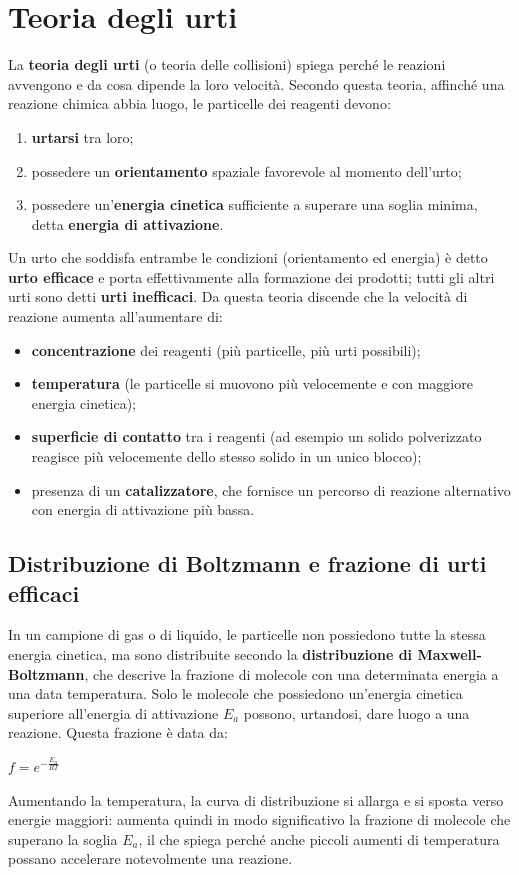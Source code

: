 \documentclass[11pt, a4paper, openright]{book}
\begin{document}
\section{Teoria degli urti}
La \textbf{teoria degli urti} (o teoria delle collisioni) spiega perché le reazioni avvengono e da cosa dipende la loro velocità. Secondo questa teoria, affinché una reazione chimica abbia luogo, le particelle dei reagenti devono:
\begin{enumerate}
    \item \textbf{urtarsi} tra loro;
    \item possedere un \textbf{orientamento} spaziale favorevole al momento dell'urto;
    \item possedere un'\textbf{energia cinetica} sufficiente a superare una soglia minima, detta \textbf{energia di attivazione}.
\end{enumerate}
Un urto che soddisfa entrambe le condizioni (orientamento ed energia) è detto \textbf{urto efficace} e porta effettivamente alla formazione dei prodotti; tutti gli altri urti sono detti \textbf{urti inefficaci}.
Da questa teoria discende che la velocità di reazione aumenta all'aumentare di:
\begin{itemize}
    \item \textbf{concentrazione} dei reagenti (più particelle, più urti possibili);
    \item \textbf{temperatura} (le particelle si muovono più velocemente e con maggiore energia cinetica);
    \item \textbf{superficie di contatto} tra i reagenti (ad esempio un solido polverizzato reagisce più velocemente dello stesso solido in un unico blocco);
    \item presenza di un \textbf{catalizzatore}, che fornisce un percorso di reazione alternativo con energia di attivazione più bassa.
\end{itemize}
\subsection{Distribuzione di Boltzmann e frazione di urti efficaci}
In un campione di gas o di liquido, le particelle non possiedono tutte la stessa energia cinetica, ma sono distribuite secondo la \textbf{distribuzione di Maxwell-Boltzmann}, che descrive la frazione di molecole con una determinata energia a una data temperatura.
Solo le molecole che possiedono un'energia cinetica superiore all'energia di attivazione $E_a$ possono, urtandosi, dare luogo a una reazione. Questa frazione è data da:
\begin{center}
    $ f = e^{-\frac{E_a}{RT}}$
\end{center}
Aumentando la temperatura, la curva di distribuzione si allarga e si sposta verso energie maggiori: aumenta quindi in modo significativo la frazione di molecole che superano la soglia $E_a$, il che spiega perché anche piccoli aumenti di temperatura possano accelerare notevolmente una reazione.
\end{document}

